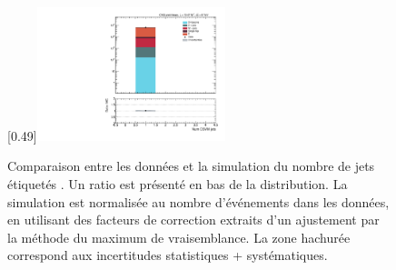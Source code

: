 \begin{figure}[p!]
    [0.49\textwidth]{\includegraphics[width=0.49\textwidth,angle=-90,origin=c]{annexes/figs/higgs/data_mc/1-btag/semie/nBTaggedJets_reco_fullsel.pdf}}
    \caption{Comparaison entre les données et la simulation du nombre de jets étiquetés \Pbottom. Un ratio est présenté en bas de la distribution. La simulation est normalisée au nombre d'événements dans les données, en utilisant des facteurs de correction extraits d'un ajustement par la méthode du maximum de vraisemblance. La zone hachurée correspond aux incertitudes statistiques + systématiques.}
    \label{fig:higgs_data_mc_nb}
\end{figure}